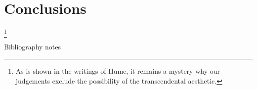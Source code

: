 \documentclass[screen]{resphilosophica}
\begin{document}
\section{Conclusions}
\label{sec:concl}

\kant[17-20]

\kant*[21]\footnote{As is shown in the writings of Hume, it remains a
  mystery why our judgements exclude the possibility of the
  transcendental aesthetic.} 

\begin{notes}{Bibliography notes}
  \kant[4-12]
\end{notes}

        
        


\end{document}
